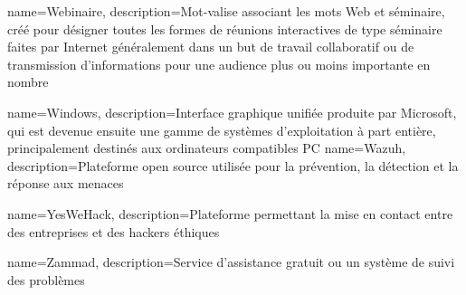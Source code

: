 {
    name=Webinaire,
    description={Mot-valise associant les mots Web et séminaire, créé pour désigner toutes les formes de réunions interactives de type séminaire faites par Internet généralement dans un but de travail collaboratif ou de transmission d'informations pour une audience plus ou moins importante en nombre}
}


{
    name=Windows,
    description={Interface graphique unifiée produite par Microsoft, qui est devenue ensuite une gamme de systèmes d’exploitation à part entière, principalement destinés aux ordinateurs compatibles PC}
}
{
    name=Wazuh,
    description={Plateforme open source utilisée pour la prévention, la détection et la réponse aux menaces}
}


{
    name=YesWeHack,
    description={Plateforme permettant la mise en contact entre des entreprises et des hackers éthiques}
}

{
    name=Zammad,
    description={Service d'assistance gratuit ou un système de suivi des problèmes}
}

































